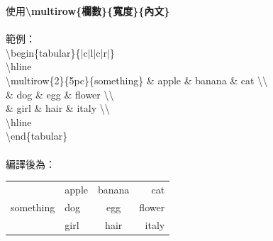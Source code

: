 \documentclass[12pt]{article}
\begin{document}
\begin{CJK*}{UTF8}{bsmi}
\begin{itemize}
					使用\textbf{\textbackslash multirow\{欄數\}\{寬度\}\{內文\}} \\ \\
					範例： \\
					\hspace*{2pc}\textbackslash begin\{tabular\}\{$\vert$c$\vert$l$\vert$c$\vert$r$\vert$\} \\
					\hspace*{4pc} \textbackslash hline \\
					\hspace*{4pc} \textbackslash multirow\{2\}\{5pc\}\{something\} \& apple \& banana \& cat \textbackslash \textbackslash \\
					\hspace*{4pc}  \& dog \& egg \& flower \textbackslash \textbackslash \\
					\hspace*{4pc}  \& girl \& hair \& italy \textbackslash \textbackslash \\
					\hspace*{4pc} \textbackslash hline \\
					\hspace*{2pc} \textbackslash end\{tabular\} \\ \\
					編譯後為：
					\begin{tabular}{|c|l|c|r|}
						\hline
						\multirow{3}{5pc}{something} & apple & banana & cat \\
						& dog & egg & flower \\
						& girl & hair & italy \\
						\hline
					\end{tabular}
				\end{itemize}
			
			\newpage

\end{CJK*}
\end{document}
